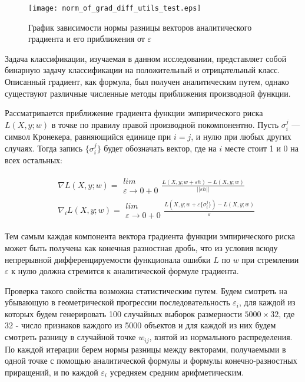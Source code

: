 \documentclass{article}
\begin{document}
\begin{wrapfigure}{r}{0.4\textwidth}
    \centering
    \texttt{[image: norm\_of\_grad\_diff\_utils\_test.eps]}
    \caption{График зависимости нормы разницы векторов аналитического градиента   и его приближения от $\varepsilon$}
    \label{fig:norm_of_grad_diff}
\end{wrapfigure}

    Задача классификации, изучаемая в данном исследовании, представляет собой бинарную задачу классификации на положительный и отрицательный класс. Описанный градиент, как формула, был получен аналитическим путем, однако существуют различные численные методы приближения производной функции. 
    
    Рассматривается приближение градиента функции эмпирического риска $L(X, y; w)$ в точке по правилу правой производной покомпонентно. Пусть $\sigma_i^j$ — символ Кронекера, равняющийся единице при $i=j$, и нулю при любых других случаях. Тогда запись $\{\sigma_i^j\}$ будет обозначать вектор, где на $i$ месте стоит 1 и 0 на всех остальных:


    \begin{align*}
    & \nabla L(X, y; w)=\substack{lim \\ \varepsilon \rightarrow 0+0} \frac{L(X, y; w + \varepsilon h) - L(X, y; w)}{||\varepsilon h||} \\
    & \nabla_{i} L(X, y; w)= \substack{lim \\ \varepsilon \rightarrow 0+0} \frac{L(X, y; w + \varepsilon \{\sigma_i^j\}) - L(X, y; w)}{\varepsilon} 
    \end{align*}

    Тем самым каждая компонента вектора градиента функции эмпирического риска может быть получена как конечная разностная дробь, что из условия всюду непрерывной дифференцируемости функционала ошибки $L$ по $w$ при стремлении $\varepsilon$ к нулю должна стремится к аналитической формуле градиента.

    Проверка такого свойства возможна статистическим путем. Будем смотреть на убывающую в геометрической прогрессии последовательность $\varepsilon_i$, для каждой из которых будем генерировать 100 случайных выборок размерности $5000 \times 32$, где 32 - число признаков каждого из 5000 объектов и для каждой из них будем смотреть разницу в случайной точке $w_{ij}$, взятой из нормального распределения. По каждой итерации берем нормы разницы между векторами, получаемыми в одной точке с помощью аналитической формулы и формулы конечно-разностных приращений, и по каждой $\varepsilon_i$ усредняем средним арифметическим. 
    
\end{document}
